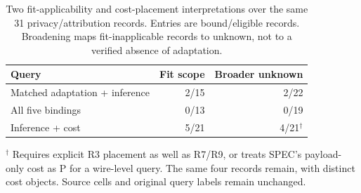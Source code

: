 \begin{table}[t]\centering\footnotesize
\caption{Two fit-applicability and cost-placement interpretations over the same 31 privacy/attribution records. Entries are bound/eligible records. Broadening maps fit-inapplicable records to unknown, not to a verified absence of adaptation.}\label{tab:r36-sensitivity}
\begin{tabularx}{\columnwidth}{@{}Yrr@{}}\toprule
Query & Fit scope & Broader unknown\\\midrule
Matched adaptation + inference & 2/15 & 2/22\\
All five bindings & 0/13 & 0/19\\
\midrule
Inference + cost & 5/21 & 4/21$^{\dagger}$\\
\bottomrule\end{tabularx}
\par\smallskip\raggedright $^{\dagger}$ Requires explicit R3 placement as well as R7/R9, or treats SPEC's payload-only cost as P for a wire-level query. The same four records remain, with distinct cost objects. Source cells and original query labels remain unchanged.
\end{table}
